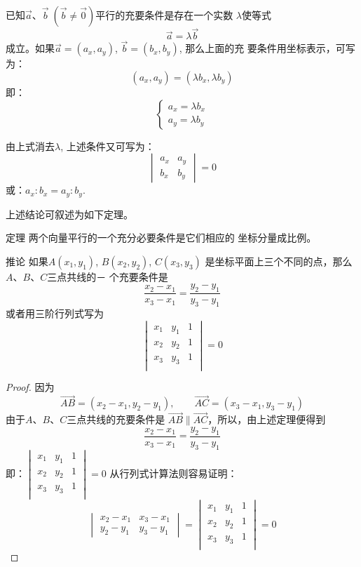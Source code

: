 已知$\vec{a}$、$\vec{b}\; (\vec{b}\ne \vec{0})$平行的充要条件是存在一个实数
$\lambda$使等式
\[\vec{a}=\lambda\vec{b}\]
成立。如果$\vec{a}=(a_x,a_y)$, $\vec{b}=(b_x,b_y)$, 
那么上面的充
要条件用坐标表示，可写为：
\[(a_x,a_y)=(\lambda b_x,\lambda b_y)\]
即：
\[\begin{cases}
    a_x=\lambda b_x\\
a_y=\lambda b_y
\end{cases}\]

由上式消去$\lambda$, 上述条件又可写为：
\[\begin{vmatrix}
    a_x& a_y\\b_x&b_y
\end{vmatrix}=0\]
或：$a_x:b_x=a_y:b_y$.

上述结论可叙述为如下定理。

\begin{blk}
    {定理} 两个向量平行的一个充分必要条件是它们相应的
坐标分量成比例。
\end{blk}

\begin{blk}
{推论} 如果$A(x_1,y_1)$, $B(x_2,y_2)$, $C(x_3,y_3)$
是坐标平面上三个不同的点，那么$A$、$B$、$C$三点共线的－
个充要条件是
\[\frac{x_2-x_1}{x_3-x_1}=\frac{y_2-y_1}{y_3-y_1}\]
或者用三阶行列式写为
\[\begin{vmatrix}
    x_1&y_1&1\\
    x_2&y_2&1\\
    x_3&y_3&1\\
\end{vmatrix}=0\]
\end{blk}

\begin{proof}
    因为
\[\Vec{AB}=(x_2-x_1,y_2-y_1),\qquad \Vec{AC}=(x_3-x_1,y_3-y_1)\]
由于$A$、$B$、$C$三点共线的充要条件是
$\Vec{AB}\parallel \Vec{AC}$，所以，由上述定理便得到
\[\frac{x_2-x_1}{x_3-x_1}=\frac{y_2-y_1}{y_3-y_1}\]
即：$\begin{vmatrix}
    x_1&y_1&1\\
    x_2&y_2&1\\
    x_3&y_3&1\\
\end{vmatrix}=0$
从行列式计算法则容易证明：
\[\begin{vmatrix}
    x_2-x_1&x_3-x_1\\
    y_2-y_1&y_3-y_1
\end{vmatrix}=\begin{vmatrix}
    x_1&y_1&1\\
    x_2&y_2&1\\
    x_3&y_3&1\\
\end{vmatrix}=0\]
\end{proof}


